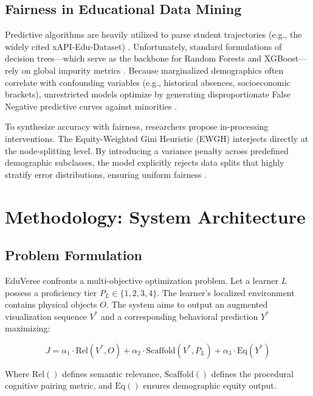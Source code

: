 \documentclass[conference]{IEEEtran}
\begin{document}
\subsection{Fairness in Educational Data Mining}

Predictive algorithms are heavily utilized to parse student trajectories (e.g., the widely cited xAPI-Edu-Dataset) \cite{harris2021xapi}. Unfortunately, standard formulations of decision trees—which serve as the backbone for Random Forests and XGBoost—rely on global impurity metrics \cite{wright2025fairtrees}. Because marginalized demographics often correlate with confounding variables (e.g., historical absences, socioeconomic brackets), unrestricted models optimize by generating disproportionate False Negative predictive curves against minorities \cite{clark2022equity}.

To synthesize accuracy with fairness, researchers propose in-processing interventions. The Equity-Weighted Gini Heuristic (EWGH) \cite{davis2023equity} interjects directly at the node-splitting level. By introducing a variance penalty across predefined demographic subclasses, the model explicitly rejects data splits that highly stratify error distributions, ensuring uniform fairness \cite{taylor2024algorithmic}.

\section{Methodology: System Architecture}

\subsection{Problem Formulation}

EduVerse confronts a multi-objective optimization problem. Let a learner $L$ possess a proficiency tier $P_L \in \{1, 2, 3, 4\}$. The learner’s localized environment contains physical objects $O$. The system aims to output an augmented visualization sequence $V^*$ and a corresponding behavioral prediction $Y^*$ maximizing:

\begin{equation}
J = \alpha_1 \cdot \text{Rel}(V^*, O) + \alpha_2 \cdot \text{Scaffold}(V^*, P_L) + \alpha_3 \cdot \text{Eq}(Y^*)
\end{equation}

Where $\text{Rel}()$ defines semantic relevance, $\text{Scaffold}()$ defines the procedural cognitive pairing metric, and $\text{Eq}()$ ensures demographic equity output.
\end{document}
